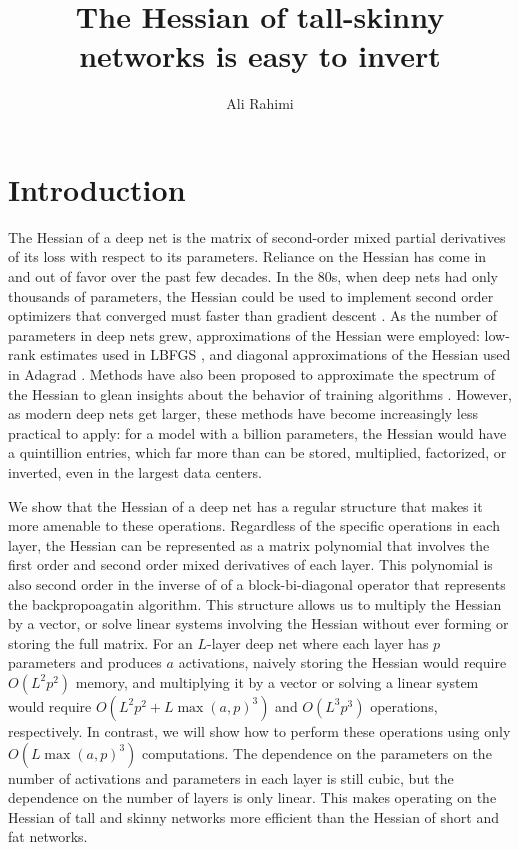 \documentclass{article}
\title{The Hessian of tall-skinny networks is easy to invert}
\author{Ali Rahimi}
\begin{document}
\maketitle

\section{Introduction}

The Hessian of a deep net is the matrix of second-order mixed partial
derivatives of its loss with respect to its parameters. Reliance on the Hessian
has come in and out of favor over the past few decades. In the 80s, when deep
nets had only thousands of parameters, the Hessian could be used to implement
second order optimizers that converged must faster than gradient descent
\cite{Watrous1987, Barnard1992}. As the number of parameters in deep nets grew,
approximations of the Hessian were employed: low-rank estimates used in LBFGS
\cite{Webb1988, lbfgs-deep-net}, and diagonal approximations of the Hessian
used in Adagrad \cite{adagrad}. Methods have also been proposed to approximate
the spectrum of the Hessian to glean insights about the behavior of training
algorithms \cite{ying-behrooz-hessian-spectrum}. However, as modern deep nets
get larger, these methods have become increasingly less practical to apply: for
a model with a billion parameters, the Hessian would have a quintillion
entries, which far more than can be stored, multiplied, factorized, or
inverted, even in the largest data centers.

We show that the Hessian of a deep net has a regular structure that makes it
more amenable to these operations. Regardless of the specific operations in
each layer, the Hessian can be represented as a matrix polynomial that involves
the first order and second order mixed derivatives of each layer. This
polynomial is also second order in the inverse of of a block-bi-diagonal
operator that represents the backpropoagatin algorithm. This structure allows
us to multiply the Hessian by a vector, or solve linear systems involving the
Hessian without ever forming or storing the full matrix. For an $L$-layer deep
net where each layer has $p$ parameters and produces $a$ activations, naively
storing the Hessian would require $O(L^2p^2)$ memory, and multiplying it by a
vector or solving a linear system would require $O(L^2p^2 + L\max(a,p)^3)$ and
$O(L^3p^3)$ operations, respectively. In contrast, we will show how to perform
these operations using only $O(L \max(a, p)^3)$ computations. The dependence on
the parameters on the number of activations and parameters in each layer is
still cubic, but the dependence on the number of layers is only linear. This
makes operating on the Hessian of tall and skinny networks more efficient than
the Hessian of short and fat networks.
\end{document}
